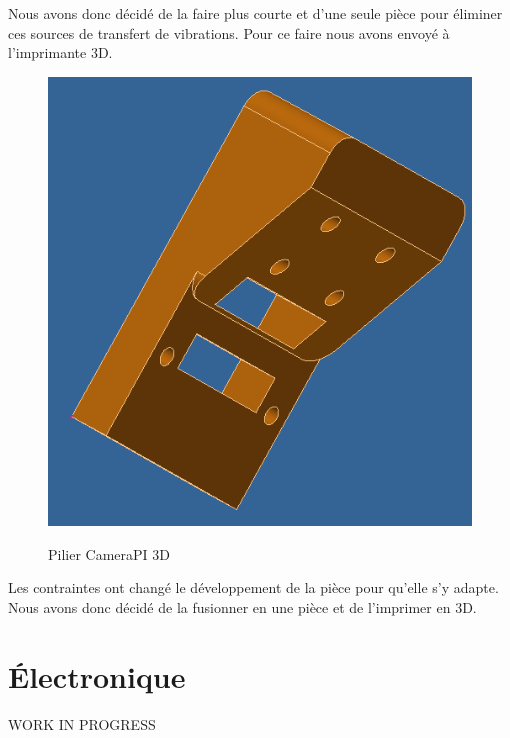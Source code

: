 \documentclass[
	a4paper,									%
	11pt,										%
	twoside,									%
	openright,									%
	notitlepage,									%
	parskip=half,								%
]{scrreprt}										%
\begin{document}
Nous avons donc décidé de la faire plus courte et d'une seule pièce pour éliminer ces sources de transfert de vibrations. 
Pour ce faire nous avons envoyé à l'imprimante 3D. \par

\begin{figure}[!h]
	\centering 
	\includegraphics[scale=.4]{img/SupportCameraPIV2.png}
	\label{SupportCameraPIV2}
	\caption{Pilier CameraPI 3D}	
\end{figure}

Les contraintes ont changé le développement de la pièce pour qu'elle s'y adapte. Nous avons donc décidé de 
la fusionner en une pièce et de l'imprimer en 3D. \par

\chapter{Électronique}

WORK IN PROGRESS



\end{document}
